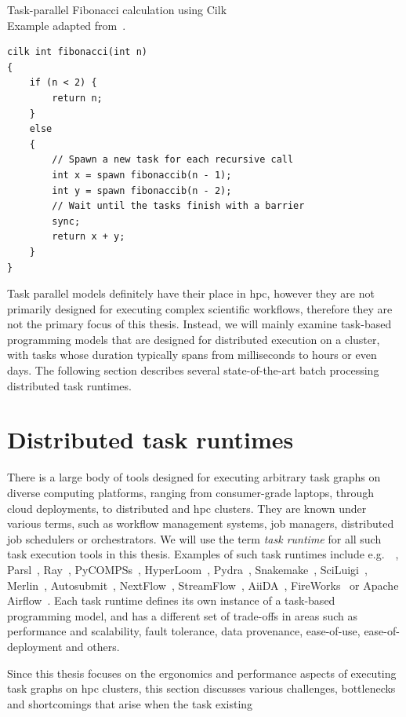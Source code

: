 \begin{listing}
	\caption{Task-parallel Fibonacci calculation using Cilk\\Example adapted from~\cite{cilk}.}
	\label{lst:cilk-fibonacci}
	\begin{verbatim}
cilk int fibonacci(int n)
{
	if (n < 2) {
		return n;
	}
	else
	{
		// Spawn a new task for each recursive call
		int x = spawn fibonaccib(n - 1);
		int y = spawn fibonaccib(n - 2);
		// Wait until the tasks finish with a barrier
		sync;
		return x + y;
	}
}
	\end{verbatim}
\end{listing}

Task parallel models definitely have their place in \gls{hpc}, however they are
not primarily designed for executing complex scientific workflows, therefore they are not the
primary focus of this thesis. Instead, we will mainly examine task-based programming models that
are designed for distributed execution on a cluster, with tasks whose duration typically spans from
milliseconds to hours or even days. The following section describes several state-of-the-art batch
processing distributed task runtimes.

\section{Distributed task runtimes}
There is a large body of tools designed for executing arbitrary task graphs on diverse computing
platforms, ranging from consumer-grade laptops, through cloud deployments, to distributed and
\gls{hpc} clusters. They are known under various terms, such as workflow
management systems, job managers, distributed job schedulers or orchestrators. We will use the term
\emph{task runtime} for all such task execution tools in this thesis. Examples of such task
runtimes include e.g.\ \dask{}~\cite{dask},
Parsl~\cite{parsl}, Ray~\cite{ray},
PyCOMPSs~\cite{pycompss}, HyperLoom~\cite{hyperloom},
Pydra~\cite{pydra}, Snakemake~\cite{snakemake},
SciLuigi~\cite{sciluigi}, Merlin~\cite{merlin},
Autosubmit~\cite{autosubmit}, NextFlow~\cite{nextflow},
StreamFlow~\cite{streamflow}, AiiDA~\cite{aiida},
FireWorks~\cite{fireworks} or Apache Airflow~\cite{airfow}. Each task
runtime defines its own instance of a task-based programming model, and has a different set of
trade-offs in areas such as performance and scalability, fault tolerance, data
provenance, ease-of-use, ease-of-deployment and others.

Since this thesis focuses on the ergonomics and performance aspects of executing task graphs on \gls{hpc} clusters,
this section discusses various challenges, bottlenecks and shortcomings that arise when the task
existing


